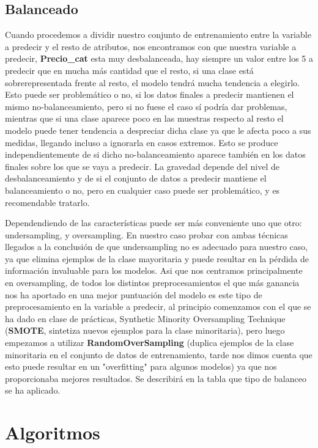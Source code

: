 \documentclass[12pt,twoside]{report}
\begin{document}
\subsection*{Balanceado}
Cuando procedemos a dividir nuestro conjunto de entrenamiento entre la variable a predecir y el resto de atributos, nos encontramos con que nuestra variable a predecir, \textbf{Precio\_cat} esta muy desbalanceada, hay siempre un valor entre los 5 a predecir que en mucha más cantidad que el resto, si una clase está sobrerepresentada frente al resto, el modelo tendrá mucha tendencia a elegirlo. Esto puede ser problemático o no, si los datos finales a predecir mantienen el mismo no-balanceamiento, pero si no fuese el caso sí podría dar problemas, mientras que si una clase aparece poco en las muestras respecto al resto el modelo puede tener tendencia a despreciar dicha clase ya que le afecta poco a sus medidas, llegando incluso a ignorarla en casos extremos. Esto se produce independientemente de si dicho no-balanceamiento aparece también en los datos finales sobre los que se vaya a predecir. La gravedad depende del nivel de desbalanceamiento y de si el conjunto de datos a predecir mantiene el balanceamiento o no, pero en cualquier caso puede ser problemático, y es recomendable tratarlo.

Dependendiendo de las características puede ser más conveniente uno que otro: undersampling, y oversampling. En nuestro caso probar con ambas técnicas llegados a la conclusión de que undersampling no es adecuado para nuestro caso, ya que elimina ejemplos de la clase mayoritaria y puede resultar en la pérdida de información invaluable para los modelos. Asi que nos centramos principalmente en oversampling, de todos los distintos preprocesamientos el que más ganancia nos ha aportado en una mejor puntuación del modelo es este tipo de preprocesamiento en la variable a predecir, al principio comenzamos con el que se ha dado en clase de prácticas, Synthetic Minority Oversampling Technique (\textbf{SMOTE}, sintetiza nuevos ejemplos para la clase minoritaria), pero luego empezamos a utilizar \textbf{RandomOverSampling} (duplica ejemplos de la clase minoritaria en el conjunto de datos de entrenamiento, tarde nos dimos cuenta que esto puede resultar en un "overfitting" para algunos modelos) ya que nos proporcionaba mejores resultados. Se describirá en la tabla que tipo de balanceo se ha aplicado.

\section*{Algoritmos}
\end{document}
